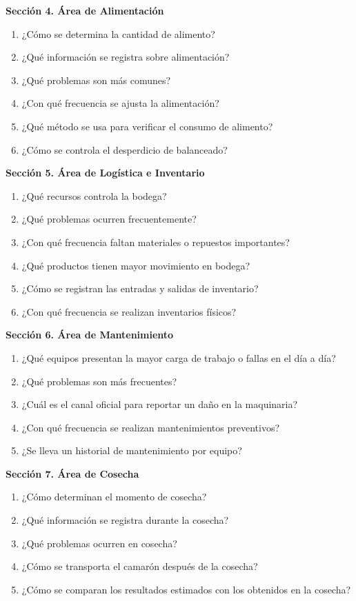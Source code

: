 \documentclass[11pt,a4paper]{article}
\begin{document}
\noindent\textbf{Sección 4. Área de Alimentación}
\begin{enumerate}[resume]
  \item ¿Cómo se determina la cantidad de alimento?
  \item ¿Qué información se registra sobre alimentación?
  \item ¿Qué problemas son más comunes?
  \item ¿Con qué frecuencia se ajusta la alimentación?
  \item ¿Qué método se usa para verificar el consumo de alimento?
  \item ¿Cómo se controla el desperdicio de balanceado?
\end{enumerate}

\noindent\textbf{Sección 5. Área de Logística e Inventario}
\begin{enumerate}[resume]
  \item ¿Qué recursos controla la bodega?
  \item ¿Qué problemas ocurren frecuentemente?
  \item ¿Con qué frecuencia faltan materiales o repuestos importantes?
  \item ¿Qué productos tienen mayor movimiento en bodega?
  \item ¿Cómo se registran las entradas y salidas de inventario?
  \item ¿Con qué frecuencia se realizan inventarios físicos?
\end{enumerate}

\noindent\textbf{Sección 6. Área de Mantenimiento}
\begin{enumerate}[resume]
  \item ¿Qué equipos presentan la mayor carga de trabajo o fallas en el día a día?
  \item ¿Qué problemas son más frecuentes?
  \item ¿Cuál es el canal oficial para reportar un daño en la maquinaria?
  \item ¿Con qué frecuencia se realizan mantenimientos preventivos?
  \item ¿Se lleva un historial de mantenimiento por equipo?
\end{enumerate}

\noindent\textbf{Sección 7. Área de Cosecha}
\begin{enumerate}[resume]
  \item ¿Cómo determinan el momento de cosecha?
  \item ¿Qué información se registra durante la cosecha?
  \item ¿Qué problemas ocurren en cosecha?
  \item ¿Cómo se transporta el camarón después de la cosecha?
  \item ¿Cómo se comparan los resultados estimados con los obtenidos en la cosecha?
\end{enumerate}
\end{document}
